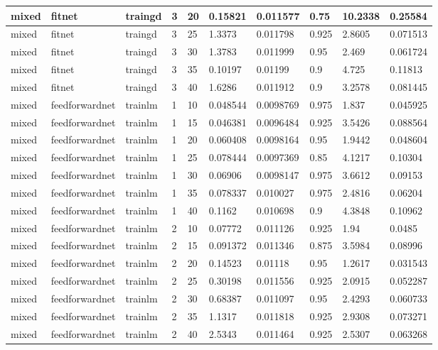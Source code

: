 \begin{longtable}{lllllllll}
mixed & fitnet & traingd & 3 & 20 & 0.15821 & 0.011577 & 0.75 & 10.2338 & 0.25584 \\ \hline 
mixed & fitnet & traingd & 3 & 25 & 1.3373 & 0.011798 & 0.925 & 2.8605 & 0.071513 \\ \hline 
mixed & fitnet & traingd & 3 & 30 & 1.3783 & 0.011999 & 0.95 & 2.469 & 0.061724 \\ \hline 
mixed & fitnet & traingd & 3 & 35 & 0.10197 & 0.01199 & 0.9 & 4.725 & 0.11813 \\ \hline 
mixed & fitnet & traingd & 3 & 40 & 1.6286 & 0.011912 & 0.9 & 3.2578 & 0.081445 \\ \hline 
mixed & feedforwardnet & trainlm & 1 & 10 & 0.048544 & 0.0098769 & 0.975 & 1.837 & 0.045925 \\ \hline 
mixed & feedforwardnet & trainlm & 1 & 15 & 0.046381 & 0.0096484 & 0.925 & 3.5426 & 0.088564 \\ \hline 
mixed & feedforwardnet & trainlm & 1 & 20 & 0.060408 & 0.0098164 & 0.95 & 1.9442 & 0.048604 \\ \hline 
mixed & feedforwardnet & trainlm & 1 & 25 & 0.078444 & 0.0097369 & 0.85 & 4.1217 & 0.10304 \\ \hline 
mixed & feedforwardnet & trainlm & 1 & 30 & 0.06906 & 0.0098147 & 0.975 & 3.6612 & 0.09153 \\ \hline 
mixed & feedforwardnet & trainlm & 1 & 35 & 0.078337 & 0.010027 & 0.975 & 2.4816 & 0.06204 \\ \hline 
mixed & feedforwardnet & trainlm & 1 & 40 & 0.1162 & 0.010698 & 0.9 & 4.3848 & 0.10962 \\ \hline 
mixed & feedforwardnet & trainlm & 2 & 10 & 0.07772 & 0.011126 & 0.925 & 1.94 & 0.0485 \\ \hline 
mixed & feedforwardnet & trainlm & 2 & 15 & 0.091372 & 0.011346 & 0.875 & 3.5984 & 0.08996 \\ \hline 
mixed & feedforwardnet & trainlm & 2 & 20 & 0.14523 & 0.01118 & 0.95 & 1.2617 & 0.031543 \\ \hline 
mixed & feedforwardnet & trainlm & 2 & 25 & 0.30198 & 0.011556 & 0.925 & 2.0915 & 0.052287 \\ \hline 
mixed & feedforwardnet & trainlm & 2 & 30 & 0.68387 & 0.011097 & 0.95 & 2.4293 & 0.060733 \\ \hline 
mixed & feedforwardnet & trainlm & 2 & 35 & 1.1317 & 0.011818 & 0.925 & 2.9308 & 0.073271 \\ \hline 
mixed & feedforwardnet & trainlm & 2 & 40 & 2.5343 & 0.011464 & 0.925 & 2.5307 & 0.063268 \\ \hline 

\end{longtable}

